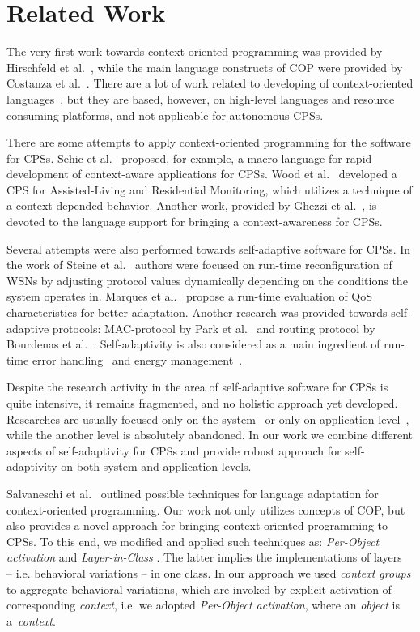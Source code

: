 \section{Related Work} \label{sec:related}
The very first work towards context-oriented programming was provided by
Hirschfeld et al.~\cite{Hirschfeld08}, while the main language constructs of COP
were provided by Costanza et al.~\cite{Costanza11}. There are a lot of work
related to developing of context-oriented
languages~\cite{Sehic11,Kamina11,Bardram05}, but they are based, however, on
high-level languages and resource consuming platforms, and not applicable for
autonomous CPSs.

There are some attempts to apply context-oriented programming for the software
for CPSs. Sehic et al.~\cite{Sehic11} proposed, for example, a macro-language
for rapid development of context-aware applications for CPSs. Wood et
al.~\cite{Wood08} developed a CPS for Assisted-Living and Residential
Monitoring, which utilizes a technique of a context-depended behavior. Another
work, provided by Ghezzi et al.~\cite{Ghezzi10}, is devoted to the language
support for bringing a context-awareness for CPSs.

Several attempts were also performed towards self-adaptive software for CPSs. In
the work of Steine et al.~\cite{Steine11} authors were focused on run-time
reconfiguration of WSNs by adjusting protocol values dynamically depending on
the conditions the system operates in. Marques et al.~\cite{Marques11} propose a
run-time evaluation of QoS characteristics for better adaptation. Another
research was provided towards self-adaptive protocols: MAC-protocol by Park et
al.~\cite{Park08} and routing protocol by Bourdenas et al.~\cite{Bourdenas11}.
Self-adaptivity is also considered as a main ingredient of run-time error
handling~\cite{Bourdenas10} and energy management~\cite{Jiang07}.

Despite the research activity in the area of self-adaptive software for CPSs is
quite intensive, it remains fragmented, and no holistic approach yet developed.
Researches are usually focused only on the
system~\cite{Steine11,Marques11,Park08,Bourdenas11,Bourdenas10,Jiang07} or only
on application level~\cite{Wood08,Sehic11,Ghezzi10}, while the another level is
absolutely abandoned. In our work we combine different aspects of
self-adaptivity for CPSs and provide robust approach for self-adaptivity on both
system and application levels.

Salvaneschi et al.~\cite{Salvaneschi11,Salvaneschi12} outlined possible
techniques for language adaptation for context-oriented programming. Our work
not only utilizes concepts of COP, but also provides a novel approach for
bringing context-oriented programming to CPSs. To this end, we modified and
applied such techniques as: \emph{Per-Object activation} and
\emph{Layer-in-Class} \cite{Salvaneschi12}. The latter implies the
implementations of layers~\cite{Costanza11} -- i.e. behavioral variations -- in
one class. In our approach we used \emph{context groups} to aggregate behavioral
variations, which are invoked by explicit activation of corresponding
\emph{context}, i.e. we adopted \emph{Per-Object activation}, where an
\emph{object} is a~\emph{context}.
